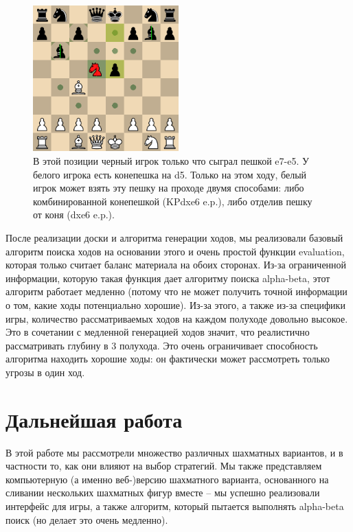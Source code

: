 \documentclass{article}
\begin{document}
\begin{figure}[h]
    \centering
    \includegraphics[width=0.5\textwidth]{img/enpassant-demo.png}
    \caption{
        В этой позиции черный игрок только что сыграл пешкой e7-e5. У белого игрока есть конепешка на d5.
        Только на этом ходу, белый игрок может взять эту пешку на проходе
        двумя способами: либо комбинированной конепешкой (KPdxe6 e.p.),
        либо отделив пешку от коня (dxe6 e.p.).
    }
\end{figure}


После реализации доски 
и алгоритма генерации ходов,
мы реализовали базовый алгоритм поиска ходов на основании этого
и очень простой функции evaluation,
которая только считает баланс материала на обоих сторонах.
Из-за ограниченной информации, которую такая функция дает алгоритму поиска alpha-beta,
этот алгоритм работает медленно (потому что не может получить точной информации о том, какие ходы потенциально хорошие).
Из-за этого, а также из-за специфики игры,
количество рассматриваемых ходов на каждом полуходе довольно высокое.
Это в сочетании с медленной генерацией ходов значит,
что реалистично рассматривать глубину в 3 полухода.
Это очень ограничивает способность алгоритма находить хорошие ходы:
он фактически может рассмотреть только угрозы в один ход.


\section{Дальнейшая работа}

В этой работе мы рассмотрели множество различных шахматных вариантов,
и в частности то, как они влияют на выбор стратегий.
Мы также представляем компьютерную (а именно веб-)версию шахматного варианта,
основанного на сливании нескольких шахматных фигур вместе --
мы успешно реализовали интерфейс для игры,
а также алгоритм, который пытается выполнять alpha-beta поиск (но делает это очень медленно).
\end{document}
